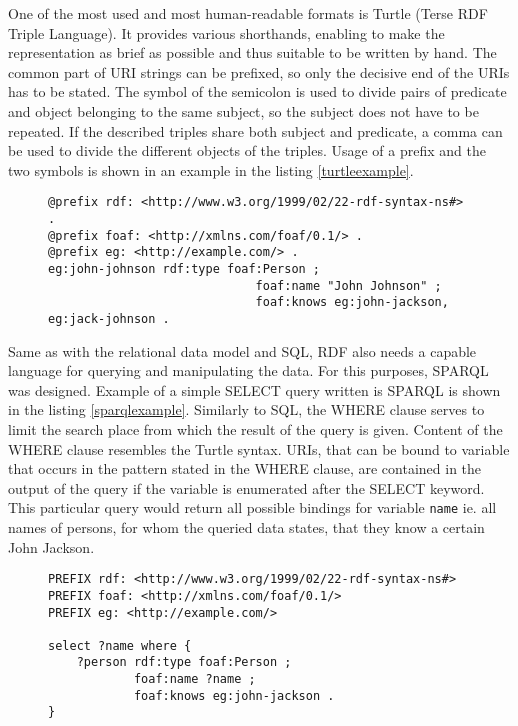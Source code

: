 One of the most used and most human-readable formats is Turtle (Terse RDF Triple Language).\cite{turtlew3c2014} It provides various shorthands, enabling to make the representation as brief as possible and thus suitable to be written by hand. The common part of URI strings can be prefixed, so only the decisive end of the URIs has to be stated. The symbol of the semicolon is used to divide pairs of predicate and object belonging to the same subject, so the subject does not have to be repeated. If the described triples share both subject and predicate, a comma can be used to divide the different objects of the triples. Usage of a prefix and the two symbols is shown in an example in the listing \ref{turtleexample}.

\begin{figure}[h]
\begin{lstlisting}[language = turtle, caption={Example of RDF data described in Turtle format}, label={turtleexample},captionpos=b escapeinside={(*@}{@*)}]
@prefix rdf: <http://www.w3.org/1999/02/22-rdf-syntax-ns#> .
@prefix foaf: <http://xmlns.com/foaf/0.1/> .
@prefix eg: <http://example.com/> .
eg:john-johnson rdf:type foaf:Person ;
                             foaf:name "John Johnson" ;
                             foaf:knows eg:john-jackson, eg:jack-johnson .
\end{lstlisting}
\end{figure}

Same as with the relational data model and SQL, RDF also needs a capable language for querying and manipulating the data. For this purposes, SPARQL was designed.\cite{sparqlw3c2008} Example of a simple SELECT query written is SPARQL is shown in the listing \ref{sparqlexample}. Similarly to SQL, the WHERE clause serves to limit the search place from which the result of the query is given. Content of the WHERE clause resembles the Turtle syntax. URIs, that can be bound to variable that occurs in the pattern stated in the WHERE clause, are contained in the output of the query if the variable is enumerated after the SELECT keyword. This particular query would return all possible bindings for variable \verb|name| ie. all names of persons, for whom the queried data states, that they know a certain John Jackson.

\begin{figure}[h]
\begin{lstlisting}[language = SPARQL, caption={Example of a simple SPARQL query}, label={sparqlexample},captionpos=b escapeinside={(*@}{@*)}]
PREFIX rdf: <http://www.w3.org/1999/02/22-rdf-syntax-ns#>
PREFIX foaf: <http://xmlns.com/foaf/0.1/>
PREFIX eg: <http://example.com/>

select ?name where {
    ?person rdf:type foaf:Person ;
            foaf:name ?name ;
            foaf:knows eg:john-jackson .
}
\end{lstlisting}
\end{figure}

